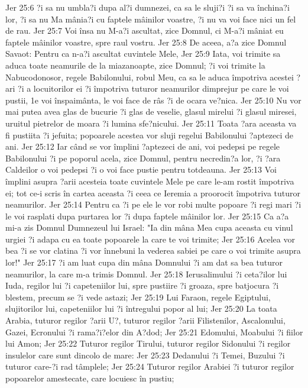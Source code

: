 Jer 25:6  ?i sa nu umbla?i dupa al?i dumnezei, ca sa le sluji?i ?i sa va închina?i lor, ?i sa nu Ma mânia?i cu faptele mâinilor voastre, ?i nu va voi face nici un fel de rau.
Jer 25:7  Voi însa nu M-a?i ascultat, zice Domnul, ci M-a?i mâniat eu faptele mâinilor voastre, spre raul vostru.
Jer 25:8  De aceea, a?a zice Domnul Savaot: Pentru ca n-a?i ascultat cuvintele Mele,
Jer 25:9  Iata, voi trimite sa aduca toate neamurile de la miazanoapte, zice Domnul; ?i voi trimite la Nabucodonosor, regele Babilonului, robul Meu, ca sa le aduca împotriva acestei ?ari ?i a locuitorilor ei ?i împotriva tuturor neamurilor dimprejur pe care le voi pustii, 1e voi înspaimânta, le voi face de râs ?i de ocara ve?nica.
Jer 25:10  Nu vor mai putea avea glas de bucurie ?i glas de veselie, glasul mirelui ?i glasul miresei, uruitul pietrelor de moara ?i lumina sfe?nicului.
Jer 25:11  Toata ?ara aceasta va fi pustiita ?i jefuita; popoarele acestea vor sluji regelui Babilonului ?aptezeci de ani.
Jer 25:12  Iar când se vor împlini ?aptezeci de ani, voi pedepsi pe regele Babilonului ?i pe poporul acela, zice Domnul, pentru necredin?a lor, ?i ?ara Caldeilor o voi pedepsi ?i o voi face pustie pentru totdeauna.
Jer 25:13  Voi împlini asupra ?arii acesteia toate cuvintele Mele pe care le-am rostit împotriva ei; tot ce-i scris în cartea aceasta ?i ceea ce Ieremia a proorocit împotriva tuturor neamurilor.
Jer 25:14  Pentru ca ?i pe ele le vor robi multe popoare ?i regi mari ?i le voi rasplati dupa purtarea lor ?i dupa faptele mâinilor lor.
Jer 25:15  Ca a?a mi-a zis Domnul Dumnezeul lui Israel: "Ia din mâna Mea cupa aceasta cu vinul urgiei ?i adapa cu ea toate popoarele la care te voi trimite;
Jer 25:16  Acelea vor bea ?i se vor clatina ?i vor înnebuni la vederea sabiei pe care o voi trimite asupra lor!"
Jer 25:17  ?i am luat cupa din mâna Domnului ?i am dat sa bea tuturor neamurilor, la care m-a trimis Domnul.
Jer 25:18  Ierusalimului ?i ceta?ilor lui Iuda, regilor lui ?i capeteniilor lui, spre pustiire ?i groaza, spre batjocura ?i blestem, precum se ?i vede astazi;
Jer 25:19  Lui Faraon, regele Egiptului, slujitorilor lui, capeteniilor lui ?i întregului popor al lui;
Jer 25:20  La toata Arabia, tuturor regilor ?arii U?, tuturor regilor ?arii Filistenilor, Ascalonului, Gazei, Ecronului ?i rama?i?elor din A?dod;
Jer 25:21  Edomului, Moabului ?i fiilor lui Amon;
Jer 25:22  Tuturor regilor Tirului, tuturor regilor Sidonului ?i regilor insulelor care sunt dincolo de mare:
Jer 25:23  Dedanului ?i Temei, Buzului ?i tuturor care-?i rad tâmplele;
Jer 25:24  Tuturor regilor Arabiei ?i tuturor regilor popoarelor amestecate, care locuiesc în pustiu;
